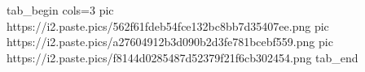  
 
 
 
 

\ifcmt
  tab_begin cols=3
     pic https://i2.paste.pics/562f61fdeb54fce132bc8bb7d35407ee.png
		 pic https://i2.paste.pics/a27604912b3d090b2d3fe781bcebf559.png
		 pic https://i2.paste.pics/f8144d0285487d52379f21f6cb302454.png
  tab_end
\fi
